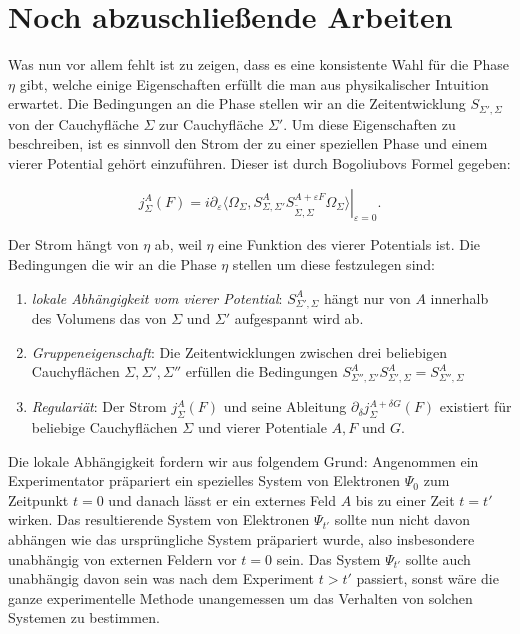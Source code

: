\documentclass[a4paper,12pt]{article}
\begin{document}
\section{Noch abzuschließende Arbeiten}
Was nun vor allem fehlt ist zu zeigen, dass es eine konsistente Wahl für die Phase \(\eta\) gibt, welche
einige Eigenschaften erfüllt die man aus physikalischer Intuition
erwartet. Die Bedingungen an die Phase
stellen wir an die Zeitentwicklung \(S_{\Sigma',\Sigma}\) von der Cauchyfläche
 \(\Sigma\) zur Cauchyfläche \(\Sigma'\). 
Um diese Eigenschaften zu beschreiben, ist es sinnvoll den Strom der zu einer speziellen Phase
und einem vierer Potential gehört einzuführen. Dieser ist durch Bogoliubovs Formel gegeben:

\begin{equation}
j^A_{\Sigma}(F)=i \partial_\varepsilon \left. \langle \Omega_{\Sigma}, S^A_{\Sigma,\Sigma'} S_{\tilde{\Sigma},\Sigma}^{A+\varepsilon F} \Omega_{\Sigma}\rangle \right|_{\varepsilon=0}.
\end{equation}

Der Strom hängt von \(\eta\) ab, weil \(\eta\) eine Funktion des vierer Potentials ist. 
Die Bedingungen die wir an die Phase \(\eta\) stellen um diese festzulegen sind:

\begin{enumerate}
\item \emph{lokale Abhängigkeit vom vierer Potential}: \(S^A_{\Sigma',\Sigma}\) hängt nur von \(A\) innerhalb des Volumens das von \(\Sigma\) und \(\Sigma'\) aufgespannt wird ab.
\item \emph{Gruppeneigenschaft}: Die Zeitentwicklungen zwischen drei beliebigen Cauchyflächen \(\Sigma,\Sigma',\Sigma''\) erfüllen die Bedingungen \(S_{\Sigma'',\Sigma'}^A S_{\Sigma',\Sigma}^A = S_{\Sigma'',\Sigma}^A\)
\item \emph{Regulariät}: Der Strom \(j^A_{\Sigma}(F)\) und seine Ableitung \(\partial_\delta j^{A+\delta G}_{\Sigma}(F)\) existiert für beliebige Cauchyflächen \(\Sigma\) und vierer Potentiale \(A,F\) und \(G\).
\end{enumerate}

Die lokale Abhängigkeit fordern wir aus folgendem Grund: Angenommen ein Experimentator präpariert ein spezielles 
System von Elektronen \(\Psi_0\) zum Zeitpunkt \(t=0\) und danach lässt er ein externes Feld \(A\) bis zu einer Zeit \(t=t'\) wirken.
Das resultierende System von Elektronen \(\Psi_{t'}\) sollte nun nicht davon abhängen wie das ursprüngliche System präpariert wurde,
also insbesondere unabhängig von externen Feldern vor \(t=0\) sein. Das System \(\Psi_{t'}\) sollte auch unabhängig davon sein
was nach dem Experiment \(t>t'\) passiert, sonst wäre die ganze experimentelle Methode unangemessen um das Verhalten von
solchen Systemen zu bestimmen. 
\end{document}
